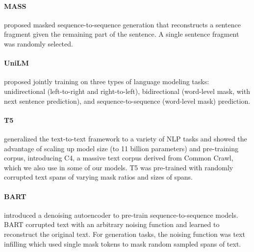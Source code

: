 \documentclass{article}
\newcommand\todo[1]{\textcolor{red}{TODO(#1)}}
\begin{document}
\paragraph{MASS} \citep{song2019mass} proposed masked sequence-to-sequence generation that reconstructs a sentence fragment given the remaining part of the sentence. A single sentence fragment was randomly selected.

\paragraph{UniLM} \citep{unilm} proposed jointly training on three types of language modeling tasks: unidirectional (left-to-right and right-to-left), bidirectional (word-level mask, with next sentence prediction), and sequence-to-sequence (word-level mask) prediction.

\paragraph{T5}\citep{raffel2019exploring} generalized the text-to-text framework to a variety of NLP tasks and showed the advantage of scaling up model size (to 11 billion parameters) and pre-training corpus, introducing C4,
a massive text corpus derived from Common Crawl, which we also use in some of our 
models. T5 was pre-trained with randomly corrupted text spans of varying mask ratios and sizes of spans.  

\paragraph{BART} \citep{lewis2019bart} introduced a denoising autoencoder to pre-train sequence-to-sequence models. BART corrupted text with an arbitrary noising function and learned to reconstruct the original text. For generation tasks, the noising function was text infilling which used single mask tokens to mask random sampled spans of text. 
\end{document}
